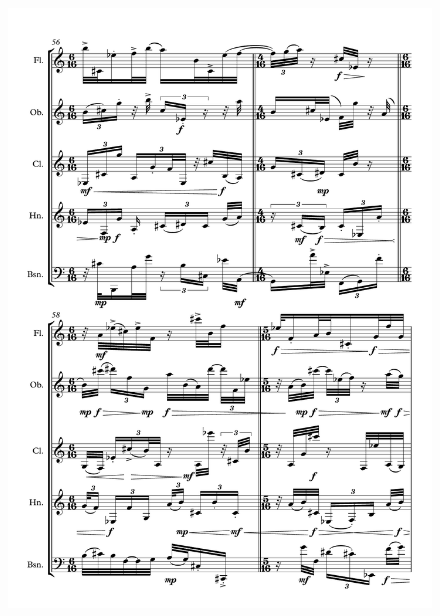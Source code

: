 \begin{figure}[H]
    \centering
	\includegraphics[width=6.5in]{figures/Out_of_Focus_12.pdf}
\end{figure}


